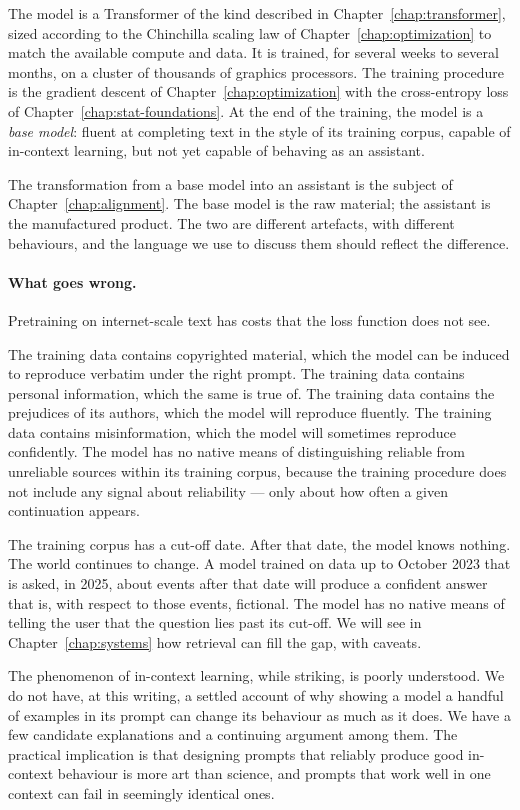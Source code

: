 The model is a Transformer of the kind described in Chapter~\ref{chap:transformer},
sized according to the Chinchilla scaling law of Chapter~\ref{chap:optimization} to
match the available compute and data. It is trained, for
several weeks to several months, on a cluster of thousands of
graphics processors. The training procedure is the gradient
descent of Chapter~\ref{chap:optimization} with the cross-entropy loss of Chapter~\ref{chap:stat-foundations}.
At the end of the training, the model is a \emph{base model}:
fluent at completing text in the style of its training corpus,
capable of in-context learning, but not yet capable of behaving
as an assistant.

The transformation from a base model into an assistant is the
subject of Chapter~\ref{chap:alignment}. The base model is the raw material; the
assistant is the manufactured product. The two are different
artefacts, with different behaviours, and the language we use
to discuss them should reflect the difference.

\paragraph{What goes wrong.} Pretraining on internet-scale text has costs that the loss
function does not see.

The training data contains copyrighted material, which the
model can be induced to reproduce verbatim under the right
prompt. The training data contains personal information, which
the same is true of. The training data contains the prejudices
of its authors, which the model will reproduce fluently. The
training data contains misinformation, which the model will
sometimes reproduce confidently. The model has no native means
of distinguishing reliable from unreliable sources within its
training corpus, because the training procedure does not
include any signal about reliability --- only about how often a
given continuation appears.

The training corpus has a cut-off date. After that date, the
model knows nothing. The world continues to change. A model
trained on data up to October 2023 that is asked, in 2025,
about events after that date will produce a confident answer
that is, with respect to those events, fictional. The model has
no native means of telling the user that the question lies past
its cut-off. We will see in Chapter~\ref{chap:systems} how retrieval can fill
the gap, with caveats.

The phenomenon of in-context learning, while striking, is
poorly understood. We do not have, at this writing, a settled
account of why showing a model a handful of examples in its
prompt can change its behaviour as much as it does. We have a
few candidate explanations and a continuing argument among them.
The practical implication is that designing prompts that
reliably produce good in-context behaviour is more art than
science, and prompts that work well in one context can fail in
seemingly identical ones.

